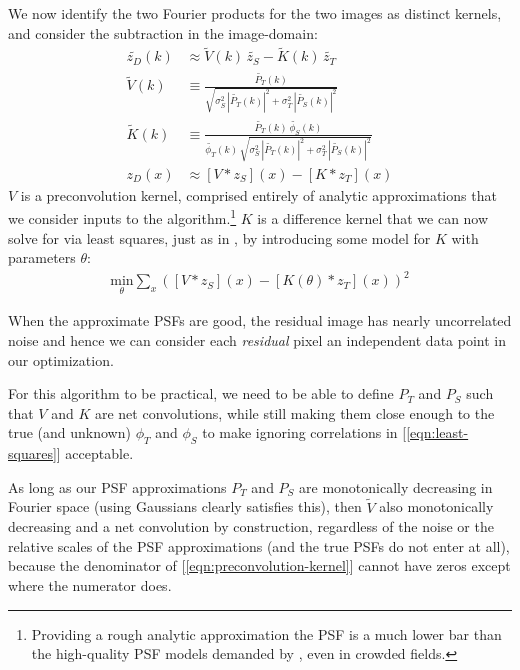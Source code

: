 \documentclass[DM,authoryear,toc]{lsstdoc}
\newcommand{\ZOGY}{\citetalias{2016ApJ...830...27Z}}
\newcommand{\AL}{\citetalias{1998ApJ...503..325A}}
\begin{document}
We now identify the two Fourier products for the two images as distinct kernels, and consider the subtraction in the image-domain:
\begin{align}
  \widetilde{z_D}(k) & \approx \widetilde{V}(k) \, \widetilde{z_S}
    - \widetilde{K}(k) \, \widetilde{z_T} \\
  \widetilde{V}(k) & \equiv \frac{
    \widetilde{P_T}(k)
  }{
    \sqrt{
      \sigma_S^2 \, \left|\widetilde{P_T}(k)\right|^2
      + \sigma_T^2 \, \left|\widetilde{P_S}(k)\right|^2
    }
  } \label{eqn:preconvolution-kernel} \\
  \widetilde{K}(k) & \equiv \frac{
      \widetilde{P_T}(k) \, \widetilde{\phi_S}(k)
  }{
    \widetilde{\phi_T}(k) \,
    \sqrt{
      \sigma_S^2 \, \left|\widetilde{P_T}(k)\right|^2
      + \sigma_T^2 \, \left|\widetilde{P_S}(k)\right|^2
    }
  } \\
  z_D(x) & \approx \left[V \ast z_S\right](x) - \left[K \ast z_T\right](x)
\end{align}
$V$ is a preconvolution kernel, comprised entirely of analytic approximations that we consider inputs to the algorithm.\footnote{Providing a rough analytic approximation the PSF is a much lower bar than the high-quality PSF models demanded by \ZOGY{}, even in crowded fields.}
$K$ is a difference kernel that we can now solve for via least squares, just as in \AL{}, by introducing some model for $K$ with parameters $\theta$:
\begin{align}
  \underset{\theta}{\text{min}} \sum_x \left(
      \left[V \ast z_S\right](x) - \left[K(\theta) \ast z_T\right](x)
    \right)^2
  \label{eqn:least-squares}
\end{align}

When the approximate PSFs are good, the residual image has nearly uncorrelated noise and hence we can consider each \emph{residual} pixel an independent data point in our optimization.

For this algorithm to be practical, we need to be able to define $P_T$ and $P_S$ such that $V$ and $K$ are net convolutions, while still making them close enough to the true (and unknown) $\phi_T$ and $\phi_S$ to make ignoring correlations in [\ref{eqn:least-squares}] acceptable.

As long as our PSF approximations $P_T$ and $P_S$ are monotonically decreasing in Fourier space (using Gaussians clearly satisfies this), then $\widetilde{V}$ also monotonically decreasing and a net convolution by construction, regardless of the noise or the relative scales of the PSF approximations (and the true PSFs do not enter at all), because the denominator of [\ref{eqn:preconvolution-kernel}] cannot have zeros except where the numerator does.
\end{document}
